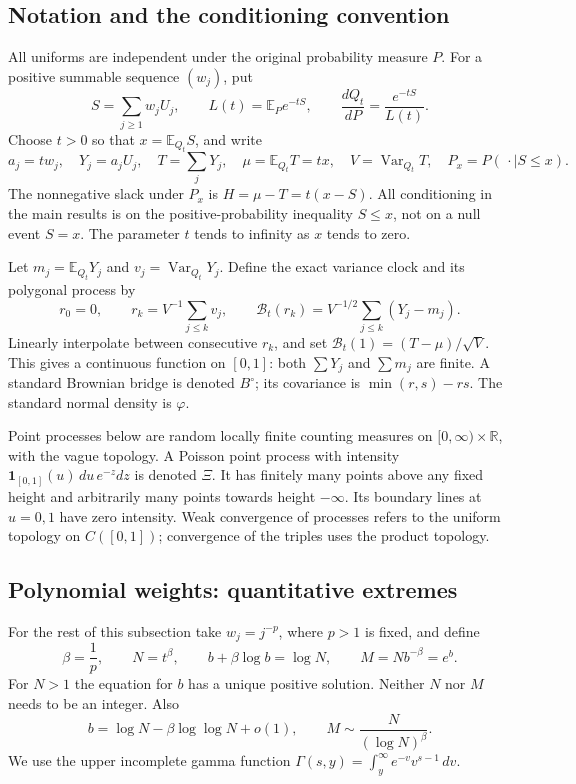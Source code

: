 \documentclass[11pt,a4paper]{article}
\numberwithin{equation}{section}
\theoremstyle{definition}
\theoremstyle{remark}
\newcommand{\E}{\mathbb E}
\newcommand{\R}{\mathbb R}
\newcommand{\ind}{\mathbf 1}
\newcommand{\Var}{\operatorname{Var}}
\newcommand{\ph}{\varphi}
\begin{document}
\subsection{Notation and the conditioning convention}
All uniforms are independent under the original probability measure $P$.
For a positive summable sequence $(w_j)$, put
\begin{equation}
 S=\sum_{j\ge1}w_jU_j,\qquad
 L(t)=\E_Pe^{-tS},\qquad
 \frac{dQ_t}{dP}=\frac{e^{-tS}}{L(t)}. \label{eq:tilt}
\end{equation}
Choose $t>0$ so that $x=\E_{Q_t}S$, and write
\begin{equation}
 a_j=tw_j,\quad Y_j=a_jU_j,\quad T=\sum_jY_j,\quad
 \mu=\E_{Q_t}T=tx,\quad V=\Var_{Q_t}T,\quad
 P_x=P(\,\cdot\mid S\le x). \label{eq:notation}
\end{equation}
The nonnegative slack under $P_x$ is
$H=\mu-T=t(x-S)$. All conditioning in the main results is on the
positive-probability inequality $S\le x$, not on a null event $S=x$.
The parameter $t$ tends to infinity as $x$ tends to zero.

Let $m_j=\E_{Q_t}Y_j$ and $v_j=\Var_{Q_t}Y_j$. Define the exact variance
clock and its polygonal process by
\begin{equation}
 r_0=0,\qquad r_k=V^{-1}\sum_{j\le k}v_j,\qquad
 \mathcal B_t(r_k)=V^{-1/2}\sum_{j\le k}(Y_j-m_j). \label{eq:clock}
\end{equation}
Linearly interpolate between consecutive $r_k$, and set
$\mathcal B_t(1)=(T-\mu)/\sqrt V$. This gives a continuous function on
$[0,1]$: both $\sum Y_j$ and $\sum m_j$ are finite. A standard Brownian
bridge is denoted $B^\circ$; its covariance is
$\min(r,s)-rs$. The standard normal density is $\ph$.

Point processes below are random locally finite counting measures on
$[0,\infty)\times\R$, with the vague topology. A Poisson point process
with intensity $\ind_{[0,1]}(u)\,du\,e^{-z}dz$ is denoted $\Xi$.
It has finitely many points above any fixed height and arbitrarily many
points towards height $-\infty$. Its boundary lines at $u=0,1$ have zero
intensity. Weak convergence of processes refers to the uniform topology
on $C([0,1])$; convergence of the triples uses the product topology.

\subsection{Polynomial weights: quantitative extremes}
For the rest of this subsection take $w_j=j^{-p}$, where $p>1$ is fixed,
and define
\begin{equation}
 \beta=\frac1p,\qquad N=t^\beta,\qquad
 b+\beta\log b=\log N,\qquad M=Nb^{-\beta}=e^b.
 \label{eq:scales}
\end{equation}
For $N>1$ the equation for $b$ has a unique positive solution. Neither
$N$ nor $M$ needs to be an integer. Also
\begin{equation}
 b=\log N-\beta\log\log N+o(1),\qquad
 M\sim\frac{N}{(\log N)^\beta}. \label{eq:basy}
\end{equation}
We use the upper incomplete gamma function
$\Gamma(s,y)=\int_y^\infty e^{-v}v^{s-1}\,dv$.
\end{document}
